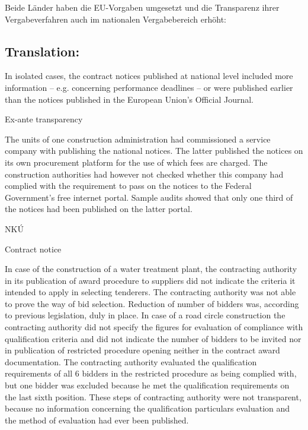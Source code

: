 \documentclass[10pt]{article}
\begin{document}
Beide Länder haben die EU-Vorgaben umgesetzt und die Transparenz ihrer Vergabeverfahren auch im nationalen Vergabebereich erhöht:



\pagebreak

\subsection*{Translation:}

In isolated cases, the contract notices published at national level included more information – e.g. concerning performance deadlines – or were published earlier than the notices published in the European Union’s Official Journal.


Ex-ante transparency

The units of one construction administration had commissioned a service company with publishing the national notices.
The latter published the notices on its own procurement platform for the use of which fees are charged.
The construction authorities had however not checked whether this company had complied with the requirement to pass on the notices to the Federal Government’s free internet portal.
Sample audits showed that only one third of the notices had been published on the latter portal.


NKÚ



Contract notice

In case of the construction of a water treatment plant, the contracting authority in its publication of award procedure to suppliers did not indicate the criteria it intended to apply in selecting tenderers.
The contracting authority was not able to prove the way of bid selection.
Reduction of number of bidders was, according to previous legislation, duly in place.
In case of a road circle construction the contracting authority did not specify the figures for evaluation of compliance with qualification criteria and did not indicate the number of bidders to be invited nor in publication of restricted procedure opening neither in the contract award documentation.
The contracting authority evaluated the qualification requirements of all 6 bidders in the restricted procedure as being complied with, but one bidder was excluded because he met the qualification requirements on the last sixth position.
These steps of contracting authority were not transparent, because no information concerning the qualification particulars evaluation and the method of evaluation had ever been published.
\end{document}
